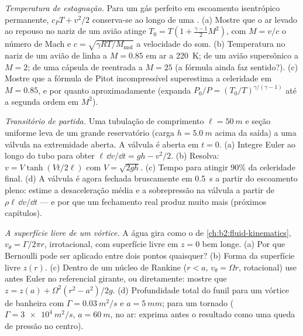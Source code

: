 \begin{exercise}[$\star\star\star$]\label{exo:b2:euler-bernoulli:10}
\emph{Temperatura de estagnação.} Para um gás perfeito em escoamento isentrópico
permanente, $c_PT + v^2/2$ conserva-se ao longo de uma . (a) Mostre que o
ar levado ao repouso no nariz de um avião atinge $T_0 = T(1 +
\tfrac{\gamma - 1}{2}M^2)$, com $M = v/c$ o número de Mach e $c =
\sqrt{\gamma RT/M_{\text{mol}}}$ a velocidade do som. (b) Temperatura no nariz
de um avião de linha a $M = 0.85$ em ar a \qty{220}{K}; de um avião supersônico
a $M = 2$; de uma cápsula de reentrada a $M = 25$ (a fórmula ainda
faz sentido?). (c) Mostre que a fórmula de Pitot incompressível
superestima a celeridade em $M = 0.85$, e por quanto aproximadamente (expanda
$P_0/P = (T_0/T)^{\gamma/(\gamma - 1)}$ até a segunda ordem em $M^2$).
\end{exercise}

\begin{exercise}[$\star\star\star$]\label{exo:b2:euler-bernoulli:11}
\emph{Transitório de partida.} Uma tubulação de comprimento $\ell = \qty{50}{m}$ e seção
uniforme leva de um grande reservatório (carga $h = \qty{5.0}{m}$ acima da
saída) a uma válvula na extremidade aberta. A válvula é aberta em $t = 0$. (a)
Integre Euler ao longo do tubo para obter $\ell\,\dd v/\dd t = gh - v^2/2$.
(b) Resolva: $v = V\tanh(Vt/2\ell)$ com $V = \sqrt{2gh}$. (c) Tempo para
atingir $90\%$ da celeridade final. (d) A válvula é agora fechada bruscamente em
\qty{0.5}{s} a partir do escoamento pleno: estime a desaceleração média e a
sobrepressão na válvula a partir de $\rho\ell\,\dd v/\dd t$ --- e por que um fechamento
real produz muito mais (próximos capítulos).
\end{exercise}

\begin{exercise}[$\star\star\star$]\label{exo:b2:euler-bernoulli:12}
\emph{A superfície livre de um vórtice.} A água gira como o 
de \cref{ch:b2:fluid-kinematics}, $v_\theta = \Gamma/2\pi r$, irrotacional,
com superfície livre em $z = 0$ bem longe. (a) Por que Bernoulli pode ser aplicado
entre dois pontos quaisquer? (b) Forma da superfície livre $z(r)$. (c)
Dentro de um núcleo de Rankine ($r < a$, $v_\theta = \Omega r$, rotacional) use
antes Euler no referencial girante, ou diretamente: mostre que $z = z(a) +
\Omega^2(r^2 - a^2)/2g$. (d) Profundidade total do funil para um vórtice de
banheira com $\Gamma = \qty{0.03}{m^2/s}$ e $a = \qty{5}{mm}$; para um tornado
($\Gamma = \qty{3e4}{m^2/s}$, $a = \qty{60}{m}$, no ar: exprima antes o
resultado como uma queda de pressão no centro).
\end{exercise}

